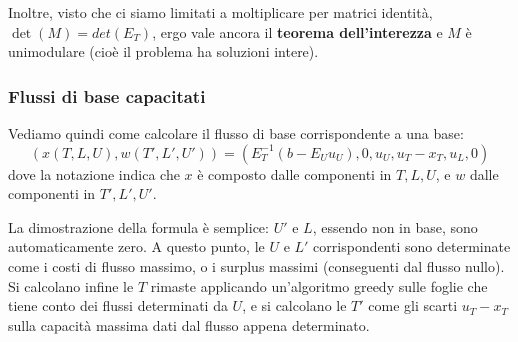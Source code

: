 \documentclass[a4paper,11pt]{article}
\begin{document}
Inoltre, visto che ci siamo limitati a moltiplicare per matrici identità, $\det(M) = det(E_T)$, ergo vale ancora il \textbf{teorema dell'interezza} e $M$ è unimodulare (cioè il problema ha soluzioni intere).

\subsubsection{Flussi di base capacitati}
Vediamo quindi come calcolare il flusso di base corrispondente a una base:
$$
(x(T, L, U), w(T', L', U')) = \left( E_T^{-1} (b - E_U u_U), 0, u_U, u_T - x_T, u_L, 0 \right)
$$
dove la notazione indica che $x$ è composto dalle componenti in $T, L, U$, e $w$ dalle componenti in $T', L', U'$.

La dimostrazione della formula è semplice: $U'$ e $L$, essendo non in base, sono automaticamente zero.
A questo punto, le $U$ e $L'$ corrispondenti sono determinate come i costi di flusso massimo, o i surplus massimi (conseguenti dal flusso nullo).
Si calcolano infine le $T$ rimaste applicando un'algoritmo greedy sulle foglie che tiene conto dei flussi determinati da $U$, e si calcolano le $T'$ come gli scarti $u_T - x_T$ sulla capacità massima dati dal flusso appena determinato.
\end{document}

